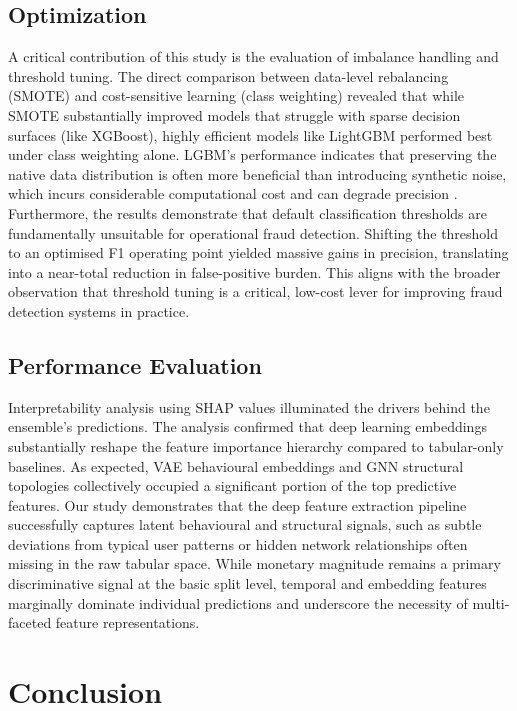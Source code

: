 \documentclass[a4paper,fleqn]{cas-sc}
\begin{document}
\subsection{Optimization}
A critical contribution of this study is the evaluation of imbalance handling and threshold tuning. The direct comparison between data-level rebalancing (SMOTE) and cost-sensitive learning (class weighting) revealed that while SMOTE substantially improved models that struggle with sparse decision surfaces (like XGBoost), highly efficient models like LightGBM performed best under class weighting alone. LGBM's performance indicates that preserving the native data distribution is often more beneficial than introducing synthetic noise, which incurs considerable computational cost and can degrade precision \cite{Kurnia2026CostSensitive}. Furthermore, the results demonstrate that default classification thresholds are fundamentally unsuitable for operational fraud detection. Shifting the threshold to an optimised F1 operating point yielded massive gains in precision, translating into a near-total reduction in false-positive burden. This aligns with the broader observation that threshold tuning is a critical, low-cost lever for improving fraud detection systems in practice.

\subsection{Performance Evaluation}
Interpretability analysis using SHAP values illuminated the drivers behind the ensemble's predictions. The analysis confirmed that deep learning embeddings substantially reshape the feature importance hierarchy compared to tabular-only baselines. As expected, VAE behavioural embeddings and GNN structural topologies collectively occupied a significant portion of the top predictive features. Our study demonstrates that the deep feature extraction pipeline successfully captures latent behavioural and structural signals, such as subtle deviations from typical user patterns or hidden network relationships often missing in the raw tabular space. While monetary magnitude remains a primary discriminative signal at the basic split level, temporal and embedding features marginally dominate individual predictions and underscore the necessity of multi-faceted feature representations.



\section{Conclusion}
\end{document}
